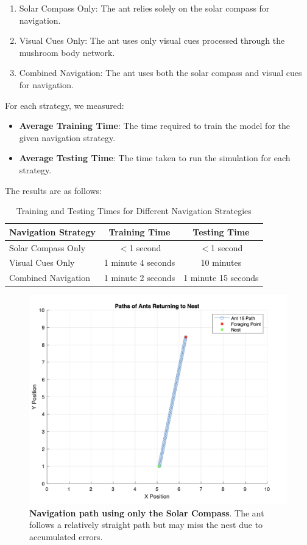 \documentclass[12pt,a4paper]{article}
\begin{document}
\begin{enumerate}
    \item Solar Compass Only: The ant relies solely on the solar compass for navigation.
    \item Visual Cues Only: The ant uses only visual cues processed through the mushroom body network.
    \item Combined Navigation: The ant uses both the solar compass and visual cues for navigation.
\end{enumerate}

For each strategy, we measured:

\begin{itemize}
    \item \textbf{Average Training Time}: The time required to train the model for the given navigation strategy.
    \item \textbf{Average Testing Time}: The time taken to run the simulation for each strategy.
\end{itemize}

The results are as follows:

\begin{table}[H]
    \centering
    \caption{Training and Testing Times for Different Navigation Strategies}
    \label{tab:times}
    \begin{tabular}{lcc}
        \toprule
        \textbf{Navigation Strategy} & \textbf{Training Time} & \textbf{Testing Time} \\
        \midrule
        Solar Compass Only & $<$1 second & $<$1 second \\
        Visual Cues Only & 1 minute 4 seconds & 10 minutes \\
        Combined Navigation & 1 minute 2 seconds & 1 minute 15 seconds \\
        \bottomrule
    \end{tabular}
\end{table}

\begin{figure}[H]
    \centering
    \includegraphics[width=0.5\linewidth]{pure_vector.png}
    \caption{\textbf{Navigation path using only the Solar Compass}. The ant follows a relatively straight path but may miss the nest due to accumulated errors.}
    \label{fig:solar_compass_only}
\end{figure}
\end{document}
